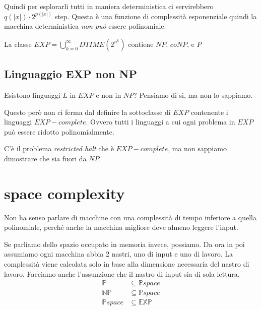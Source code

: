 \documentclass{article}
\begin{document}
Quindi per esplorarli tutti in maniera deterministica ci servirebbero $q(|x|)\cdot 2^{p(|x|)}$ step. Questa è una funzione di complessità esponenziale quindi la macchina deterministica \textit{non può} essere polinomiale.

La classe $EXP= \bigcup_{k=0}^\infty DTIME(2^{n^k})$ contiene $NP$, $coNP$, e $P$

\subsection{Linguaggio EXP non NP}
Esistono linguaggi $L$ in $EXP$ e non in $NP$? Pensiamo di si, ma non lo sappiamo. 

Questo però non ci ferma dal definire la sottoclasse di $EXP$ contenente i linguaggi $EXP-complete$. Ovvero tutti i linguaggi a cui ogni problema in $EXP$ può essere ridotto polinomialmente.

C'è il problema \textit{restricted halt} che è $EXP-complete$, ma non sappiamo dimostrare che sia fuori da $NP$.

\section{space complexity}
Non ha senso parlare di macchine con una complessità di tempo inferiore a quella polinomiale, perché anche la macchina migliore deve almeno leggere l'input.

Se parliamo dello spazio occupato in memoria invece, possiamo. Da ora in poi assumiamo ogni macchina abbia 2 nastri, uno di input e uno di lavoro. La complessità viene calcolata solo in base alla dimensione necessaria del nastro di lavoro. 
Facciamo anche l'assunzione che il nastro di input sia di sola lettura.
\begin{align*}
    \mathbb{P}&\subseteq\mathbb{P}space \\
    \mathbb{NP}&\subseteq\mathbb{P}space \\
    \mathbb{P}space &\subseteq \mathbb{EXP}
\end{align*}
\end{document}

